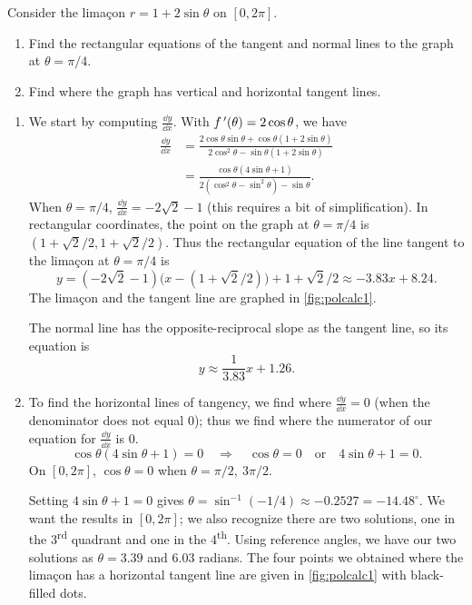 
\begin{example}\label{ex_polcalc1}%
Consider the limaçon $r=1+2\sin\theta$ on $[0,2\pi]$.
\begin{enumerate}
	\item	Find the rectangular equations of the tangent and normal lines to the graph at $\theta=\pi/4$.
	\item	Find where the graph has vertical and horizontal tangent lines.
\end{enumerate}
\solution
\begin{enumerate}
	\item We start by computing $\frac{\dd y}{\dd x}$. With $f\,'(\theta) = 2\cos\theta$, we have
	\begin{align*}
	\frac{\dd y}{\dd x} &= \frac{2\cos\theta\sin\theta + \cos\theta(1+2\sin\theta)}{2\cos^2\theta-\sin\theta(1+2\sin\theta)}\\
	&= \frac{\cos\theta(4\sin\theta+1)}{2(\cos^2\theta-\sin^2\theta)-\sin\theta}.
	\end{align*}
	When $\theta=\pi/4$, $\frac{\dd y}{\dd x}=-2\sqrt{2}-1$ (this requires a bit of simplification). In rectangular coordinates, the point on the graph at $\theta=\pi/4$ is $(1+\sqrt{2}/2,1+\sqrt{2}/2)$. Thus the rectangular equation of the line tangent to the limaçon at $\theta=\pi/4$ is 
\[y=(-2\sqrt{2}-1)\bigl(x-(1+\sqrt{2}/2)\bigr)+1+\sqrt{2}/2 \approx  -3.83 x+8.24.\]
The limaçon and the tangent line are graphed in \autoref{fig:polcalc1}. 
	
	The normal line has the opposite-reciprocal slope as the tangent line, so its equation is 
\[y \approx \frac{1}{3.83}x+1.26.\]
	
	\item		To find the horizontal lines of tangency, we find where $\frac{\dd y}{\dd x}=0$ (when the denominator does not equal 0); thus we find where the numerator of our equation for $\frac{\dd y}{\dd x}$ is 0.
	\[\cos\theta(4\sin\theta+1)=0\quad \Rightarrow \quad \cos\theta=0 \quad \text{or}\quad 4\sin\theta+1=0.\]
	On $[0,2\pi]$, $\cos\theta=0$ when $\theta=\pi/2,\ 3\pi/2$. 

Setting $4\sin\theta+1=0$ gives $\theta=\sin^{-1}(-1/4)\approx -0.2527 = -14.48^\circ$. We want the results in $[0,2\pi]$; we also recognize there are two solutions, one in the 3\textsuperscript{rd} quadrant and one in the 4\textsuperscript{th}. Using reference angles, we have our two solutions as $\theta =3.39$ and $6.03$ radians. The four points we obtained where the limaçon has a horizontal tangent line are given in \autoref{fig:polcalc1} with black-filled dots.\bigskip


\end{enumerate}
\end{example}
